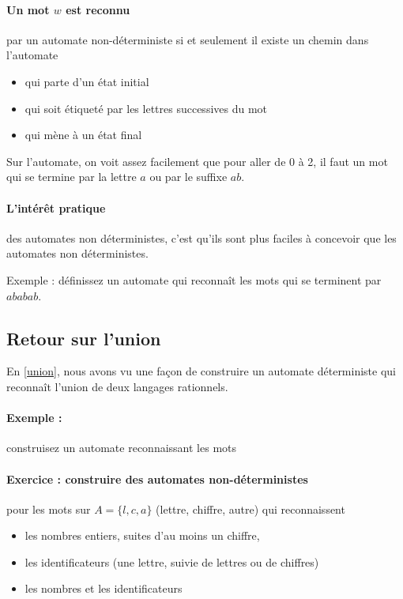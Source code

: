 \documentclass[10pt,twoside]{article}
\begin{document}
\paragraph{Un mot $w$ est reconnu} par un automate non-déterministe 
si et seulement il existe un chemin dans l'automate
\begin{itemize} 
\item qui parte d'un état initial
\item qui soit étiqueté par les lettres successives du mot
\item qui mène à un état final
\end{itemize}

Sur l'automate, on voit assez facilement que pour aller de 0 à 2, il
faut un mot qui se termine par la lettre $a$ ou par le suffixe $ab$.


\paragraph{L'intérêt pratique} des automates non déterministes, 
c'est qu'ils sont plus faciles à concevoir que les automates non déterministes.

Exemple : définissez un automate qui reconnaît les mots qui se terminent par
$ababab$.

\subsection{Retour sur l'union}

En \ref{union}, nous avons vu une façon de construire un automate déterministe
qui reconnaît l'union de  deux langages rationnels.



\paragraph{Exemple : } construisez un automate reconnaissant les mots 

\paragraph{Exercice : construire des automates non-déterministes} pour les mots sur $A = \{l,c,a\}$ (lettre, chiffre, autre)
qui reconnaissent
\begin{itemize}
\item les nombres entiers, suites d'au moins un chiffre,
\item les identificateurs (une lettre, suivie de lettres ou de chiffres)
\item les nombres et les identificateurs
\end{itemize}
\end{document}
